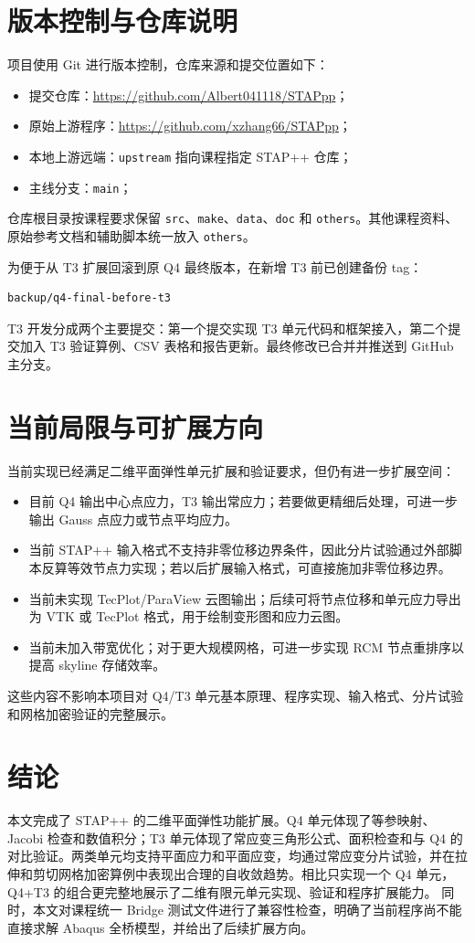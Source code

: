 ﻿\documentclass[UTF8,11pt,a4paper]{ctexart}
\begin{document}
\section{版本控制与仓库说明}
项目使用 Git 进行版本控制，仓库来源和提交位置如下：
\begin{itemize}
  \item 提交仓库：\url{https://github.com/Albert041118/STAPpp}；
  \item 原始上游程序：\url{https://github.com/xzhang66/STAPpp}；
  \item 本地上游远端：\texttt{upstream} 指向课程指定 STAP++ 仓库；
  \item 主线分支：\texttt{main}；
\end{itemize}
仓库根目录按课程要求保留 \texttt{src}、\texttt{make}、\texttt{data}、\texttt{doc} 和 \texttt{others}。其他课程资料、原始参考文档和辅助脚本统一放入 \texttt{others}。

为便于从 T3 扩展回滚到原 Q4 最终版本，在新增 T3 前已创建备份 tag：
\begin{lstlisting}
backup/q4-final-before-t3
\end{lstlisting}
T3 开发分成两个主要提交：第一个提交实现 T3 单元代码和框架接入，第二个提交加入 T3 验证算例、CSV 表格和报告更新。最终修改已合并并推送到 GitHub 主分支。

\section{当前局限与可扩展方向}
当前实现已经满足二维平面弹性单元扩展和验证要求，但仍有进一步扩展空间：
\begin{itemize}
  \item 目前 Q4 输出中心点应力，T3 输出常应力；若要做更精细后处理，可进一步输出 Gauss 点应力或节点平均应力。
  \item 当前 STAP++ 输入格式不支持非零位移边界条件，因此分片试验通过外部脚本反算等效节点力实现；若以后扩展输入格式，可直接施加非零位移边界。
  \item 当前未实现 TecPlot/ParaView 云图输出；后续可将节点位移和单元应力导出为 VTK 或 TecPlot 格式，用于绘制变形图和应力云图。
  \item 当前未加入带宽优化；对于更大规模网格，可进一步实现 RCM 节点重排序以提高 skyline 存储效率。
\end{itemize}
这些内容不影响本项目对 Q4/T3 单元基本原理、程序实现、输入格式、分片试验和网格加密验证的完整展示。

\section{结论}
本文完成了 STAP++ 的二维平面弹性功能扩展。Q4 单元体现了等参映射、Jacobi 检查和数值积分；T3 单元体现了常应变三角形公式、面积检查和与 Q4 的对比验证。两类单元均支持平面应力和平面应变，均通过常应变分片试验，并在拉伸和剪切网格加密算例中表现出合理的自收敛趋势。相比只实现一个 Q4 单元，Q4+T3 的组合更完整地展示了二维有限元单元实现、验证和程序扩展能力。 同时，本文对课程统一 Bridge 测试文件进行了兼容性检查，明确了当前程序尚不能直接求解 Abaqus 全桥模型，并给出了后续扩展方向。
\end{document}
